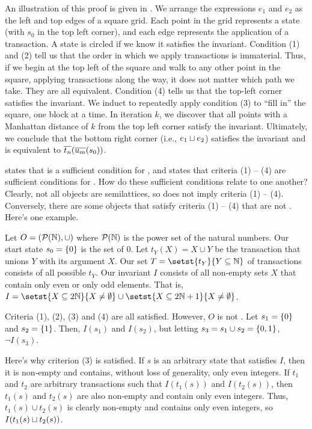 {}
{}

An illustration of this proof is given in . We
arrange the expressions $e_1$ and $e_2$ as the left and top edges of a square
grid. Each point in the grid represents a state (with $s_0$ in the top left
corner), and each edge represents the application of a transaction. A state is
circled if we know it satisfies the invariant.
%
Condition (1) and (2) tell us that the order in which we apply transactions is
immaterial. Thus, if we begin at the top left of the square and walk to any
other point in the square, applying transactions along the way, it does not
matter which path we take. They are all equivalent. Condition (4) tells us that
the top-left corner satisfies the invariant. We induct to repeatedly apply
condition (3) to ``fill in'' the square, one block at a time. In iteration $k$,
we discover that all points with a Manhattan distance of $k$ from the top left
corner satisfy the invariant. Ultimately, we conclude that the bottom right
corner (i.e., $e_1 \sqcup e_2$) satisfies the invariant and is equivalent to
$\overline{t_{n}}(\overline{u_{m}}(s_0))$.

 states that \invariantclosure{} is a
sufficient condition for \invariantconfluence{}, and 
states that criteria (1) -- (4) are sufficient conditions for
\invariantconfluence{}. How do these sufficient conditions relate to one
another?  Clearly, not all \invariantclosed{} objects are semilattices, so
\invariantclosure{} does not imply criteria (1) -- (4). Conversely, there are
some objects that satisfy criteria (1) -- (4) that are not
\invariantclosed{}. Here's one example.

\begin{example}
  Let $O = (\mathcal{P}(\mathbb{N}), \cup)$ where $\mathcal{P}(\mathbb{N})$ is the power
  set of the natural numbers. Our start state $s_0 = \{0\}$ is the set of
  $0$. Let $t_Y(X) = X \cup Y$ be the transaction that unions $Y$ with its
  argument $X$. Our set $T = \setst{t_Y}{Y \subseteq \nats}$ of transactions
  consists of all possible $t_Y$. Our invariant $I$ consists of all non-empty
  sets $X$ that contain only even or only odd elements. That is, $I = \setst{X
  \subseteq 2\nats}{X \neq \emptyset} \cup \setst{X \subseteq 2\nats + 1}{X
  \neq \emptyset}$.

  Criteria (1), (2), (3) and (4) are all satisfied. However, $O$ is not
  \Iclosed{}. Let $s_1 = \{0\}$ and $s_2 = \{1\}$. Then, $I(s_1)$ and
  $I(s_2)$, but letting $s_3 = s_1 \cup s_2 = \{0, 1\}$, $\lnot I(s_3)$.

  Here's why criterion (3) is satisfied. If $s$ is an arbitrary state that
  satisfies $I$, then it is non-empty and contains, without loss of generality,
  only even integers. If $t_1$ and $t_2$ are arbitrary transactions such that
  $I(t_1(s))$ and $I(t_2(s))$, then $t_1(s)$ and $t_2(s)$ are also non-empty
  and contain only even integers. Thus, $t_1(s) \cup t_2(s)$ is clearly
  non-empty and contains only even integers, so $I(t_1(s) \sqcup t_2(s))$.
\end{example}

